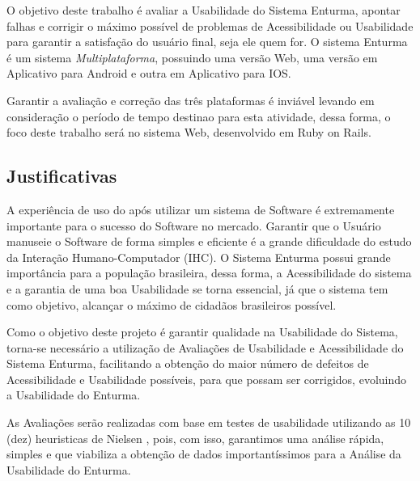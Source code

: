 	O objetivo deste trabalho é avaliar a Usabilidade do Sistema Enturma, apontar falhas e corrigir o máximo possível de problemas de Acessibilidade ou Usabilidade para garantir a satisfação do usuário final, seja ele quem for. O sistema Enturma é um sistema \textit{Multiplataforma}, possuindo uma versão Web, uma versão em Aplicativo para Android e outra em Aplicativo para IOS.

	Garantir a avaliação e correção das três plataformas é inviável levando em consideração o período de tempo destinao para esta atividade, dessa forma, o foco deste trabalho será no sistema Web, desenvolvido em Ruby on Rails.

\subsection{Justificativas}

	A experiência de uso do após utilizar um sistema de Software é extremamente importante para o sucesso do Software no mercado. Garantir que o Usuário manuseie o Software de forma simples e eficiente é a grande dificuldade do estudo da Interação Humano-Computador (IHC).
	O Sistema Enturma possui grande importância para a população brasileira, dessa forma, a Acessibilidade do sistema e a garantia de uma boa Usabilidade se torna essencial, já que o sistema tem como objetivo, alcançar o máximo de cidadãos brasileiros possível.

	Como o objetivo deste projeto é garantir qualidade na Usabilidade do Sistema, torna-se necessário a utilização de Avaliações de Usabilidade e Acessibilidade do Sistema Enturma, facilitando a obtenção do maior número de defeitos de Acessibilidade e Usabilidade possíveis, para que possam ser corrigidos, evoluindo a Usabilidade do Enturma.
	
	As Avaliações serão realizadas com base em testes de usabilidade utilizando as 10 (dez) heuristicas de Nielsen \cite{usabilidade_web}, pois, com isso, garantimos uma análise rápida, simples e que viabiliza a obtenção de dados importantíssimos para a Análise da Usabilidade do Enturma.


